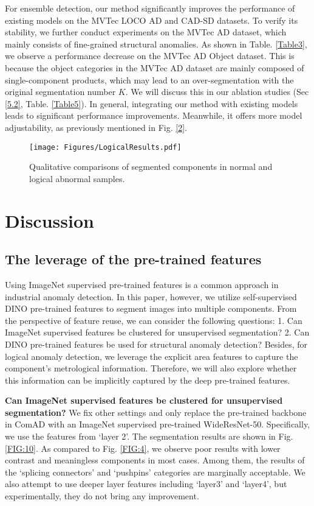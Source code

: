 \documentclass[final,5p,times,twocolumn]{elsarticle}
\begin{document}
For ensemble detection, our method significantly improves the performance of existing models on the MVTec LOCO AD and CAD-SD datasets. To verify its stability, we further conduct experiments on the MVTec AD dataset, which mainly consists of fine-grained structural anomalies. As shown in Table. \ref{Table3}, we observe a performance decrease on the MVTec AD Object dataset. This is because the object categories in the MVTec AD dataset are mainly composed of single-component products, which may lead to an over-segmentation with the original segmentation number $K$. We will discuss this in our ablation studies (Sec \ref{5.2}, Table. \ref{Table5}). In general, integrating our method with existing models leads to significant performance improvements. Meanwhile, it offers more model adjustability, as previously mentioned in Fig. \ref{2}.    

\begin{figure}
\centering
		\texttt{[image: Figures/LogicalResults.pdf]}\caption{Qualitative comparisons of segmented components in normal and logical abnormal samples.}
	\label{FIG:9}
\end{figure}

\section{Discussion}
\subsection{The leverage of the pre-trained features}
\label{5.1}
Using ImageNet supervised pre-trained features is a common approach in industrial anomaly detection. In this paper, however, we utilize self-supervised DINO pre-trained features to segment images into multiple components. From the perspective of feature reuse, we can consider the following questions: 1. Can ImageNet supervised features be clustered for unsupervised segmentation? 2. Can DINO pre-trained features be used for structural anomaly detection? Besides, for logical anomaly detection, we leverage the explicit area features to capture the component's metrological information. Therefore, we will also explore whether this information can be implicitly captured by the deep pre-trained features.

\textbf{Can ImageNet supervised features be clustered for unsupervised segmentation?} We fix other settings and only replace the pre-trained backbone in ComAD with an ImageNet supervised pre-trained WideResNet-50. Specifically, we use the features from `layer 2'. The segmentation results are shown in Fig. \ref{FIG:10}. As compared to Fig. \ref{FIG:4}, we observe poor results with lower contrast and meaningless components in most cases. Among them, the results of the `splicing connectors' and `pushpins' categories are marginally acceptable. We also attempt to use deeper layer features including `layer3' and `layer4', but experimentally, they do not bring any improvement.
\end{document}
